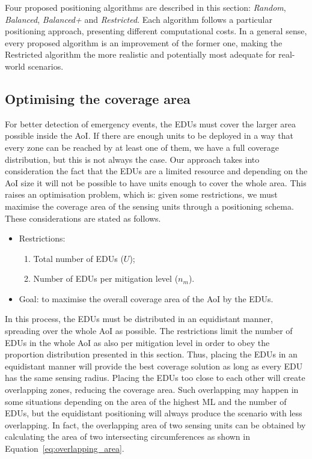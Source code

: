 \begin{refsection}
Four proposed positioning algorithms are described in this section: \emph{Random}, \emph{Balanced}, \emph{Balanced+} and \emph{Restricted}. Each algorithm follows a particular positioning approach, presenting different computational costs. In a general sense, every proposed algorithm is an improvement of the former one, making the Restricted algorithm the more realistic and potentially most adequate for real-world scenarios.

\subsection{Optimising the coverage area}

For better detection of emergency events, the EDUs must cover the larger area possible inside the AoI. If there are enough units to be deployed in a way that every zone can be reached by at least one of them, we have a full coverage distribution, but this is not always the case. Our approach takes into consideration the fact that the EDUs are a limited resource and depending on the AoI size it will not be possible to have units enough to cover the whole area. This raises an optimisation problem, which is: given some restrictions, we must maximise the coverage area of the sensing units through a positioning schema. These considerations are stated as follows.

\begin{itemize}
    \item Restrictions:
    \begin{enumerate}
        \item Total number of EDUs ($U$);
        \item Number of EDUs per mitigation level ($n_m$).
    \end{enumerate}
    \item Goal: to maximise the overall coverage area of the AoI by the EDUs.
\end{itemize}

In this process, the EDUs must be distributed in an equidistant manner, spreading over the whole AoI as possible. The restrictions limit the number of EDUs in the whole AoI as also per mitigation level in order to obey the proportion distribution presented in this section. Thus, placing the EDUs in an equidistant manner will provide the best coverage solution as long as every EDU has the same sensing radius. Placing the EDUs too close to each other will create overlapping zones, reducing the coverage area. Such overlapping may happen in some situations depending on the area of the highest ML and the number of EDUs, but the equidistant positioning will always produce the scenario with less overlapping. In fact, the overlapping area of two sensing units can be obtained by calculating the area of two intersecting circumferences as shown in Equation~\ref{eq:overlapping_area}.


\end{refsection}
